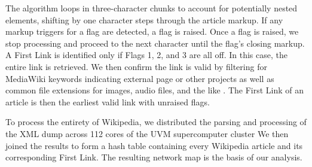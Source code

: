 \documentclass[11pt]{report}
\begin{document}
The algorithm loops in three-character chunks to account for potentially nested elements, 
shifting by one character steps through the article markup.
If any markup triggers for a flag are detected, a flag is raised. 
Once a flag is raised, we stop processing and proceed to the next character
until the flag's closing markup.
A First Link is identified only if Flags 1, 2, and 3 are all off.
In this case, the entire link is retrieved. 
We then confirm the link is valid by filtering for MediaWiki keywords indicating external page or other projects
as well as common file extensions for 
images, audio files, and the like 
\cite{media_wiki_templates}.
The First Link of an article is then the earliest valid link with unraised flags.

To process the entirety of Wikipedia, we distributed the parsing and processing of the XML dump
across 112 cores of the UVM supercomputer cluster
\cite{vacc}
We then joined the results to form a hash table containing every Wikipedia article and its corresponding
First Link. The resulting network map is the basis of our analysis.
\end{document}
